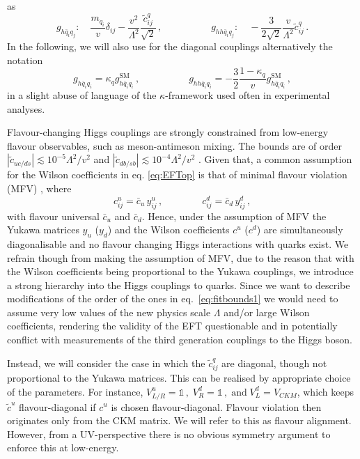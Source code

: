 as
\begin{equation}
	g_{h\bar{q}_i q_j} : \quad \frac{m_{q_i}}{v}\delta_{ij}-\frac{v^2}{\Lambda^2} \frac{\tilde{c}^q_{ij}}{\sqrt{2}}\,, \quad \quad \quad \quad \quad g_{h h\bar{q}_i q_j} : \quad -\frac{3}{2\sqrt{2}}\frac{v}{\Lambda^2}\tilde{c}^q_{ij}\,. \label{eq:couplingsEFT}
\end{equation}
In the following, we will also use for the diagonal couplings alternatively  the notation
\begin{equation}
	g_{h\bar{q}_i q_i} =\kappa_q g_{h\bar{q}_i q_i}^{\text{SM}} \,, \quad \quad \quad \quad \quad g_{h h\bar{q}_i q_i}= - \frac{3}{2}\frac{1-\kappa_q}{v}g_{h\bar{q}_i q_i}^{\text{SM}} \,,
	\label{eq:def_kappa}
\end{equation}
in a slight abuse of language of the $\kappa$-framework used often in experimental analyses.
\par
Flavour-changing Higgs couplings are strongly constrained  from low-energy flavour observables, such as meson-antimeson mixing. The bounds are of order $|\tilde{c}_{uc/ds}| \lesssim 10^{-5} \Lambda^2/v^2$ and $|\tilde{c}_{db/sb}| \lesssim 10^{-4} \Lambda^2/v^2$ \cite{Blankenburg:2012ex}. Given that, a common assumption for the Wilson coefficients in eq. \eqref{eq:EFTop} is that of minimal flavour violation (MFV) \cite{DAmbrosio:2002vsn}, where
\begin{equation}
	c^u_{ij} = \bar{c}_u \, y^u_{ij}\,, \quad\quad\quad \quad c^d_{ij} = \bar{c}_d \,y^d_{ij}\,,
\end{equation}
with flavour universal $\bar{c}_u$ and $\bar{c}_d$. Hence, under the assumption of MFV the Yukawa matrices $y_u$ ($y_d$) and the Wilson coefficients  $c^u$ ($c^d$) are simultaneously diagonalisable and no flavour changing Higgs interactions with quarks exist.
We refrain though from making the assumption of MFV, due to the reason that with the Wilson coefficients being proportional to the Yukawa couplings, we introduce a strong hierarchy into the Higgs couplings to quarks. Since we want to describe modifications of the order of the ones in eq.~\eqref{eq:fitbounds1} we would need to assume very low values of the new physics scale $\Lambda$ and/or large Wilson coefficients, rendering the validity of the EFT questionable and in potentially conflict with measurements of the third generation couplings to the Higgs boson.
\par
Instead, we will consider the case in which the $\tilde{c}^q_{ij}$ are diagonal, though not proportional to the Yukawa matrices.
This can be realised by appropriate choice of the parameters. For instance, $V_{L/R}^{u}=\mathbb{1}\, , \; V_{R}^d=\mathbb{1}\,, \; \text{and} \; V^d_L=V_{CKM}$, which keeps $\tilde{c}^u$ flavour-diagonal if $c^u$ is chosen flavour-diagonal. Flavour violation then originates only from the CKM matrix. We will refer to this as flavour alignment. However, from a UV-perspective there is no obvious symmetry argument to enforce this at low-energy.

